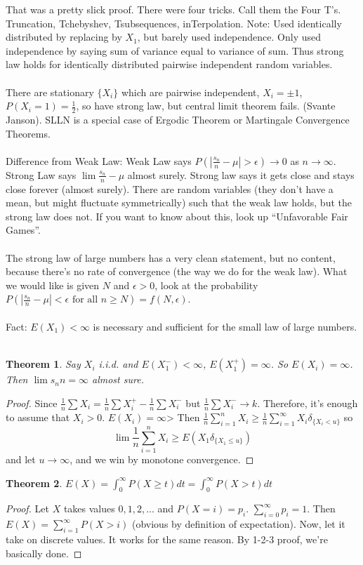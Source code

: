 \documentclass[12pt]{article}
\newtheorem{theorem}{Theorem}
\begin{document}
That was a pretty slick proof.  There were four tricks.  Call them the Four T's.  Truncation, Tchebyshev, Tsubsequences, inTerpolation.  Note: Used identically distributed by replacing by $X_1$, but barely used independence.  Only used independence  by saying sum of variance equal to variance of sum.  Thus strong law holds for identically distributed pairwise independent random variables.
\\ \\
There are stationary $\{X_i\}$ which are pairwise independent, $X_i = \pm 1$, $P(X_i = 1) = \frac{1}{2}$, so have strong law, but central limit theorem fails.  (Svante Janson).  SLLN is a special case of Ergodic Theorem or Martingale Convergence Theorems.
\\ \\
Difference from Weak Law: Weak Law says $P(|\frac{s_n}{n} - \mu | > \epsilon) \to 0$ as $n \to \infty$.  Strong Law says $\lim \frac{s_n}{n} - \mu$ almost surely.  Strong law says it gets close and stays close forever (almost surely).  There are random variables (they don't have a mean, but might fluctuate symmetrically) such that the weak law holds, but the strong law does not.  If you want to know about this, look up ``Unfavorable Fair Games''.
\\ \\
The strong law of large numbers has a very clean statement, but no content, because there's no rate of convergence (the way we do for the weak law).  What we would like is given $N$ and $\epsilon > 0$, look at the probability $P(|\frac{s_n}{n} - \mu | < \epsilon \textrm{ for all } n \ge N) = f(N, \epsilon)$.
\\ \\
Fact: $E(X_1) < \infty$ is necessary and sufficient for the small law of large numbers.
\\ \\
\begin{theorem}
Say $X_i$ i.i.d. and $E(X_1^-) < \infty$, $E(X_1^+) = \infty$.  So $E(X_i) = \infty$.  Then $\lim{s_n}{n} = \infty$ almost sure.
\end{theorem}
\begin{proof}
Since $\frac{1}{n} \sum X_i = \frac{1}{n} \sum X_i^+ - \frac{1}{n} \sum X_i^-$ but $\frac{1}{n} \sum X_i^- \to k$.  Therefore, it's enough to assume that $X_i > 0$.  $E(X_i) = \infty$>  Then $\frac{1}{n} \sum_{i=1}^n X_i \ge \frac{1}{n} \sum_{i=1}^\infty X_i \delta_{\{X_i < u \}}$
so
$$\lim \frac{1}{n} \sum_{i=1}^n X_i \ge E(X_1 \delta_{\{X_1 \le u \}})$$
and let $u \to \infty$, and we win by monotone convergence.
\end{proof}
\begin{theorem}
$E(X) = \int_0^\infty P(X \ge t) dt = \int_0^\infty P(X > t) dt$
\end{theorem}
\begin{proof}
Let $X$ takes values $0, 1, 2, ...$ and $P(X = i) = p_i$.  $\sum_{i=0}^\infty p_i = 1$.  Then $E(X) = \sum_{i=1}^\infty P(X > i)$ (obvious by definition of expectation).  Now, let it take on discrete values.  It works for the same reason.  By 1-2-3 proof, we're basically done.
\end{proof}
\end{document}
